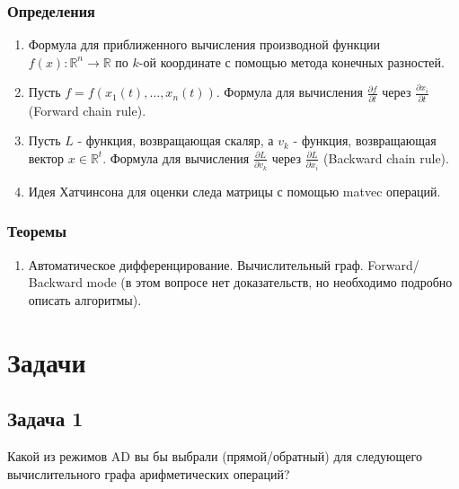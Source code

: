 \documentclass[
  russian,
  letterpaper,
  DIV=11,
  numbers=noendperiod]{scrartcl}
\providecommand{\tightlist}{%
  \setlength{\itemsep}{0pt}\setlength{\parskip}{0pt}}
\begin{document}
\subsubsection{Определения}\label{ux43eux43fux440ux435ux434ux435ux43bux435ux43dux438ux44f}

\begin{enumerate}
\def\labelenumi{\arabic{enumi}.}
\tightlist
\item
  Формула для приближенного вычисления производной функции
  \(f(x): \mathbb{R}^n \to \mathbb{R}\) по \(k\)-ой координате с помощью
  метода конечных разностей.
\item
  Пусть \(f = f(x_1(t), \ldots, x_n(t))\). Формула для вычисления
  \(\frac{\partial f}{\partial t}\) через
  \(\frac{\partial x_i}{\partial t}\) (Forward chain rule).
\item
  Пусть \(L\) - функция, возвращающая скаляр, а \(v_k\) - функция,
  возвращающая вектор \(x \in \mathbb{R}^t\). Формула для вычисления
  \(\frac{\partial L}{\partial v_k}\) через
  \(\frac{\partial L}{\partial x_i}\) (Backward chain rule).
\item
  Идея Хатчинсона для оценки следа матрицы с помощью matvec операций.
\end{enumerate}

\subsubsection{Теоремы}\label{ux442ux435ux43eux440ux435ux43cux44b}

\begin{enumerate}
\def\labelenumi{\arabic{enumi}.}
\tightlist
\item
  Автоматическое дифференцирование. Вычислительный граф. Forward/
  Backward mode (в этом вопросе нет доказательств, но необходимо
  подробно описать алгоритмы).
\end{enumerate}

\section{Задачи}\label{ux437ux430ux434ux430ux447ux438}

\subsection{Задача 1}\label{ux437ux430ux434ux430ux447ux430-1}

\begin{tcolorbox}[enhanced jigsaw, colbacktitle=quarto-callout-color!10!white, toptitle=1mm, bottomrule=.15mm, left=2mm, opacitybacktitle=0.6, colframe=quarto-callout-color-frame, arc=.35mm, bottomtitle=1mm, colback=white, coltitle=black, title=\textcolor{quarto-callout-color}{\faInfo}\hspace{0.5em}{Question}, leftrule=.75mm, opacityback=0, rightrule=.15mm, toprule=.15mm, breakable, titlerule=0mm]

Какой из режимов AD вы бы выбрали (прямой/обратный) для следующего
вычислительного графа арифметических операций?

\end{tcolorbox}
\end{document}
